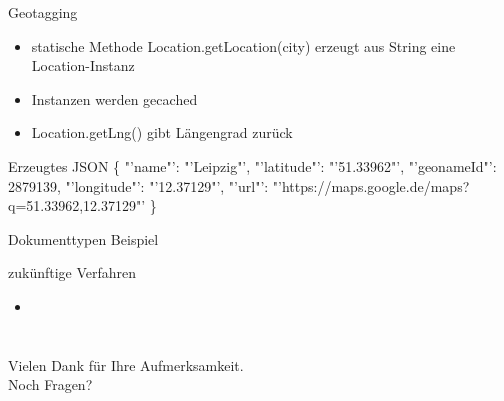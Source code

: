 \documentclass[12pt]{beamer}
\begin{document}
\begin{large}
\begin{frame}{Geotagging}
 \begin{itemize}
  \item statische Methode Location.getLocation(city) erzeugt aus String eine Location-Instanz
  \item Instanzen werden gecached
  \item Location.getLng() gibt Längengrad zurück
 \end{itemize}
 
 \begin{block}{Erzeugtes JSON}
 \normalsize \{
 \newline
 \hspace*{0.5cm}"'name"': "'Leipzig"',
 \newline
 \hspace*{0.5cm}"'latitude"': "'51.33962"',
 \newline
 \hspace*{0.5cm}"'geonameId"': 2879139,
 \newline
 \hspace*{0.5cm}"'longitude"': "'12.37129"',
 \newline
 \hspace*{0.5cm}"'url"': 
 \hspace*{0.5cm}"'https://maps.google.de/maps?q=51.33962,12.37129"'
 \newline
 \}
 \end{block}
\end{frame}
 


\begin{frame}{Dokumenttypen Beispiel}

\end{frame}


\begin{frame}{zukünftige Verfahren}
 \begin{itemize}
   \item 
 \end{itemize}
\end{frame}


\section*{}
\begin{frame}
\centering
{\Large Vielen Dank für Ihre Aufmerksamkeit. \\ Noch Fragen?}
\end{frame}

\end{large}
\end{document}
